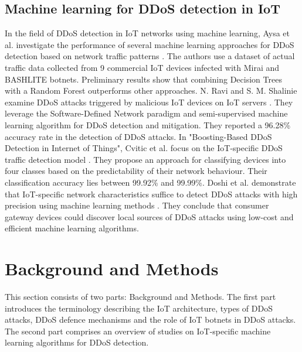 \documentclass[conference, 11pt]{IEEEtran}
\begin{document}
    \subsection{Machine learning for DDoS detection in IoT}
    In the field of DDoS detection in IoT networks using machine learning, Aysa et al. investigate the performance of several machine learning approaches for DDoS detection based on network traffic patterns \cite{article:11}.
    The authors use a dataset of actual traffic data collected from 9 commercial IoT devices infected with Mirai and BASHLITE botnets.
    Preliminary results show that combining Decision Trees with a Random Forest outperforms other approaches.
    N. Ravi and S. M. Shalinie examine DDoS attacks triggered by malicious IoT devices on IoT servers \cite{ravi2020learning}.
    They leverage the Software-Defined Network paradigm and semi-supervised machine learning algorithm for DDoS detection and mitigation.
    They reported a 96.28\% accuracy rate in the detection of DDoS attacks.
    In "Boosting-Based DDoS Detection in Internet of Things", Cvitic et al. focus on the IoT-specific DDoS traffic detection model \cite{article:10}.
    They propose an approach for classifying devices into four classes based on the predictability of their network behaviour.
    Their classification accuracy lies between 99.92\% and 99.99\%.
    Doshi et al. demonstrate that IoT-specific network characteristics suffice to detect DDoS attacks with high precision using machine learning methods \cite{inproceedings:1}.
    They conclude that consumer gateway devices could discover local sources of DDoS attacks using low-cost and efficient machine learning algorithms.


    \section{Background and Methods}
    This section consists of two parts: Background and Methods.
    The first part introduces the terminology describing the IoT architecture, types of DDoS attacks, DDoS defence mechanisms and the role of IoT botnets in DDoS attacks.
    The second part comprises an overview of studies on IoT-specific machine learning algorithms for DDoS detection.
\end{document}
